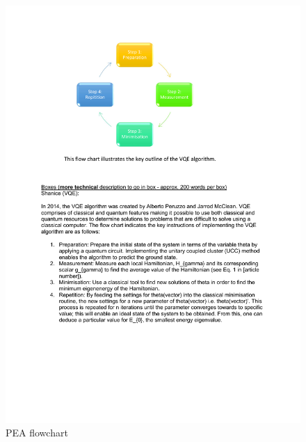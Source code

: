 \documentclass[12pt]{article}
\begin{document}
\begin{figure}[H]
\begin{center}
\includegraphics[scale=1.1]{PEA.pdf}
\end{center}
\caption{PEA flowchart}
\end{figure}
\end{document}
